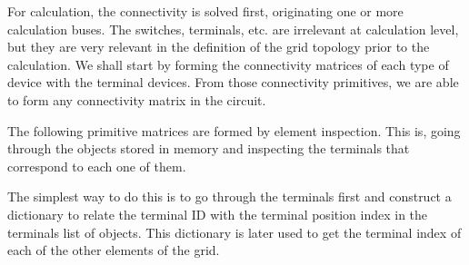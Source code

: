 \documentclass[nols,a4paper,twoside,notoc,fleqn]{tufte-book}
\begin{document}
For calculation, the connectivity is solved first, originating one or more calculation buses. The switches, terminals, etc. are irrelevant at calculation level, but they are very relevant in the definition of the grid topology prior to the calculation. We shall start by forming the connectivity matrices of each type of device with the terminal devices. From those connectivity primitives, we are able to form any connectivity matrix in the circuit. 

The following primitive matrices are formed by element inspection. This is, going through the objects stored in memory and inspecting the terminals that correspond to each one of them.

The simplest way to do this is to go through the terminals first and construct a dictionary to relate the terminal ID with the terminal position index in the terminals list of objects. This dictionary is later used to get the terminal index of each of the other elements of the grid.

\begin{table}[ht]
	\centering
	\caption{Connectivity matrix of the connectivity nodes (Buses) with the terminals: $[C_{bus,terminal}]$}
\end{table}
\end{document}
